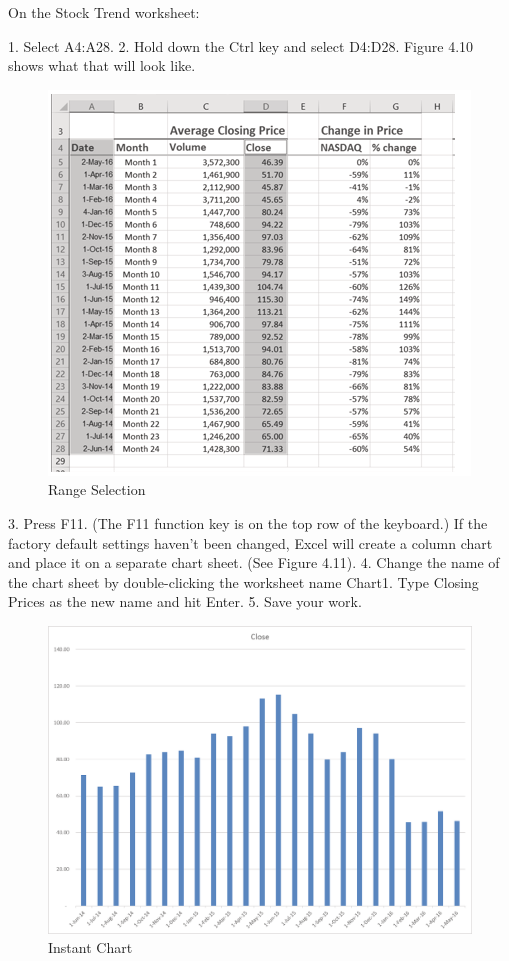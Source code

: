 On the Stock Trend worksheet:

1. Select A4:A28.
2. Hold down the Ctrl key and select D4:D28. Figure 4.10 shows what that will look like.


\begin{figure}[H]
	\centering
	\includegraphics[width=\maxwidth{.95\linewidth}]{gfx/ch04_fig13}
	\caption{Range Selection}
	\label{04:fig13}
\end{figure}





3. Press F11. (The F11 function key is on the top row of the keyboard.) If the factory default
settings haven’t been changed, Excel will create a column chart and place it on a separate chart
sheet. (See Figure 4.11).
4. Change the name of the chart sheet by double-clicking the worksheet name Chart1. Type
Closing Prices as the new name and hit Enter.
5. Save your work.



\begin{figure}[H]
	\centering
	\includegraphics[width=\maxwidth{.95\linewidth}]{gfx/ch04_fig14}
	\caption{Instant Chart}
	\label{04:fig14}
\end{figure}





